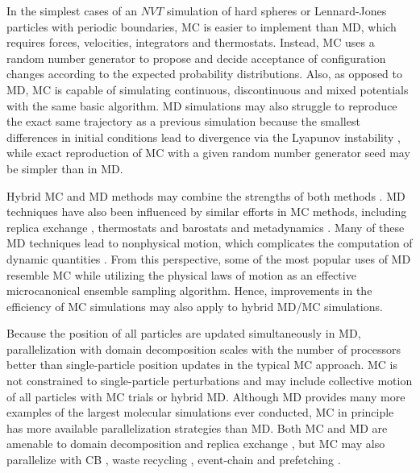 In the simplest cases of an $NVT$ simulation of hard spheres or Lennard-Jones particles with periodic boundaries, MC is easier to implement than MD, which requires forces, velocities, integrators and thermostats.
Instead, MC uses a random number generator to propose and decide acceptance of configuration changes according to the expected probability distributions.
Also, as opposed to MD, MC is capable of simulating continuous, discontinuous and mixed potentials with the same basic algorithm.
MD simulations may also struggle to reproduce the exact same trajectory as a previous simulation because the smallest differences in initial conditions lead to divergence via the Lyapunov instability \cite{posch_lyapunov_1988}, while exact reproduction of MC with a given random number generator seed may be simpler than in MD.

Hybrid MC and MD methods may combine the strengths of both methods \cite{duane_hybrid_1987, hartmann_ergodic_2008, ghoufi_hybrid_2010, spiridon_hamiltonian_2017, guo_hybrid_2018, fass_quantifying_2018, barhaghi_py-mcmd_2022}.
MD techniques have also been influenced by similar efforts in MC methods, including replica exchange \cite{swendsen_replica_1986, berg_multicanonical_1991, hukushima_exchange_1996, sugita_replica-exchange_1999}, thermostats and barostats \cite{andersen_molecular_1980} and metadynamics \cite{laio_escaping_2002}.
Many of these MD techniques lead to nonphysical motion, which complicates the computation of dynamic quantities \cite{basconi_effects_2013}.
From this perspective, some of the most popular uses of MD resemble MC while utilizing the physical laws of motion as an effective microcanonical ensemble sampling algorithm.
Hence, improvements in the efficiency of MC simulations may also apply to hybrid MD/MC simulations.

Because the position of all particles are updated simultaneously in MD, parallelization with domain decomposition \cite{plimpton_fast_1995} scales with the number of processors better than single-particle position updates in the typical MC approach.
MC is not constrained to single-particle perturbations and may include collective motion of all particles with MC trials \cite{rao_force_1979, liu_rejection-free_2004, liu_generalized_2005, whitelam_avoiding_2007} or hybrid MD.
Although MD provides many more examples of the largest molecular simulations ever conducted, MC in principle has more available parallelization strategies than MD.
Both MC and MD are amenable to domain decomposition \cite{ren_acceleration_2006, anderson_scalable_2016} and replica exchange \cite{swendsen_replica_1986}, but MC may also parallelize with CB \cite{esselink_parallel_1995, vlugt_efficiency_1999}, waste recycling \cite{frenkel_speed-up_2004}, event-chain \cite{michel_generalized_2014} and prefetching \cite{brockwell_parallel_2006, calderhead_general_2014, hatch_parallel_2020}.

